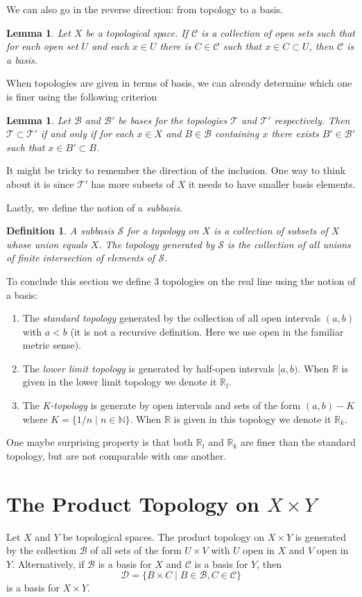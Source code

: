 \documentclass{article}
\newcommand{\Ba}{\mathcal{B}}
\newcommand{\Ta}{\mathcal{T}}
\newcommand{\R}{\mathbb{R}}
\newcommand{\N}{\mathbb{N}}
\newcommand{\Ss}{\mathcal{S}} %
\newtheorem{lemma}[theorem]{Lemma}
\newtheorem*{definition}{Definition}
\theoremstyle{remark}
\begin{document}
We can also go in the reverse direction: from topology to a basis.
\begin{lemma}
    Let $X$ be a topological space. If $\mathcal{C}$ is a collection of open sets such that for each open set $U$ and each $x\in U$ there is $C\in\mathcal{C}$ such that $x\in C\subset U$, then $\mathcal{C}$ is a basis.
\end{lemma}

When topologies are given in terms of basis, we can already determine which one is finer using the following criterion
\begin{lemma}
    Let $\Ba$ and $\Ba'$ be bases for the topologies $\Ta$ and $\Ta'$ respectively. Then
    $\Ta\subset\Ta'$ if and only if for each $x\in X$ and $B\in\Ba$ containing $x$ there exists $B'\in\Ba'$ such that $x\in B'\subset B$.
\end{lemma}
It might be tricky to remember the direction of the inclusion. One way to think about it is since $\Ta'$ has more subsets of $X$ it needs to have smaller basis elements.

Lastly, we define the notion of a \textit{subbasis}.
\begin{definition}
    A subbasis $\Ss$ for a topology on $X$ is a collection of subsets of $X$ whose union equals $X$. The topology generated by $\Ss$ is the collection of all unions of finite intersection of elements of $\Ss$.
\end{definition}

To conclude this section we define 3 topologies on the real line using the notion of a basis:
\begin{enumerate}
    \item The \textit{standard topology} generated by the collection of all open intervals $(a,b)$ with $a<b$ (it is not a recursive definition. Here we use open in the familiar metric sense).
    \item The \textit{lower limit topology} is generated by half-open intervals $[a,b)$. When $\R$ is given in the lower limit topology we denote it $\R_l$.
    \item The \textit{K-topology} is generate by open intervals and sets of the form $(a,b)-K$ where $K=\{1/n\mid n\in\N\}$. When $\R$ is given in this topology we denote it $\R_k$.
\end{enumerate}
One maybe surprising property is that both $\R_l$ and $\R_k$ are finer than the standard topology, but are not comparable with one another.

\section{The Product Topology on $X\times Y$}
Let $X$ and $Y$ be topological spaces. 
The product topology on $X\times Y$ is generated by the collection $\Ba$ of all sets of the form $U\times V$ with $U$ open in $X$ and $V$ open in $Y$.
Alternatively, if $\Ba$ is a basis for $X$ and $\mathcal{C}$ is a basis for $Y$, then
$$
    \mathcal{D}=\{B\times C\mid B\in\Ba, C\in\mathcal{C}\}
$$
is a basis for $X\times Y$.
\end{document}

